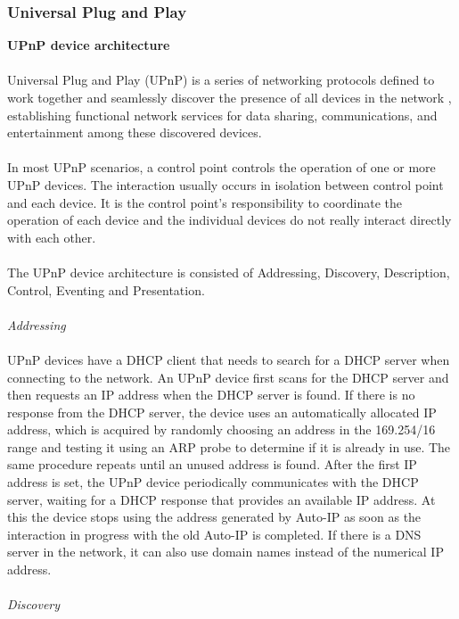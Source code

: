 \subsubsection[Universal Plug and Play]{Universal Plug and Play}
\textbf{UPnP device architecture}\\ 
\\
Universal Plug and Play (UPnP) is a series of networking protocols defined to 
work together and seamlessly discover the presence of all devices in the network 
, establishing functional network services for data sharing, communications, and 
entertainment among these discovered devices.\\
\\ 
In most UPnP scenarios, a control point controls the operation of one or more 
UPnP devices. The interaction usually occurs in isolation between control point 
and each device. It is the control point's responsibility to coordinate the operation of 
each device and the individual devices do not really interact directly with each other. \\
\\
The UPnP device architecture \cite{upnp} \label{upnp} \label{upnpdevice} 
is consisted of Addressing, Discovery, Description, Control, Eventing and
Presentation.\\
\\
\emph{Addressing} \\ 
\\
UPnP devices have a DHCP client that needs to search for a DHCP server when
connecting to the network. An UPnP device first scans for the DHCP server and
then requests an IP address when the DHCP server is found. If there is no response from the DHCP server, the device uses an automatically allocated IP address, which is acquired by randomly choosing an address in the 169.254/16 range and testing it using an ARP probe to determine if it is already in use. The same procedure repeats until an unused address is found. After the first IP address is set, the UPnP device periodically communicates with the DHCP server, waiting for a DHCP response that provides an available IP address. At this the device stops using the address generated by Auto-IP as soon as the interaction in progress with the old Auto-IP is completed. If there is a DNS server in the network, it can also use domain names instead of the numerical IP address.\\
\\ 
\emph{Discovery} \\ 
\\
